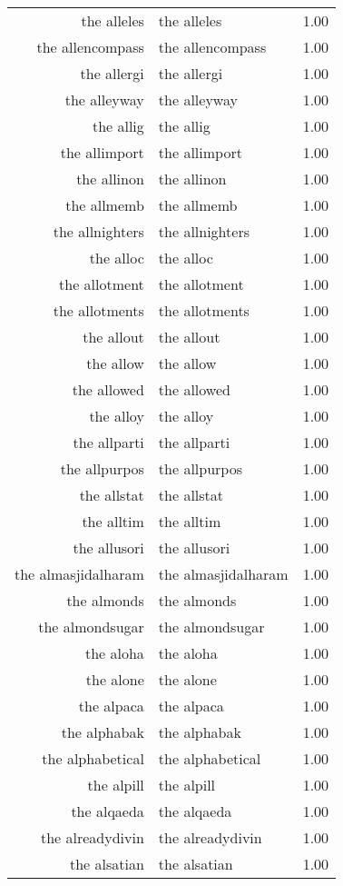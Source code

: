 \begin{table}[ht]
\begin{tabular}{rlr}
  the alleles & the alleles & 1.00 \\ 
  the allencompass & the allencompass & 1.00 \\ 
  the allergi & the allergi & 1.00 \\ 
  the alleyway & the alleyway & 1.00 \\ 
  the allig & the allig & 1.00 \\ 
  the allimport & the allimport & 1.00 \\ 
  the allinon & the allinon & 1.00 \\ 
  the allmemb & the allmemb & 1.00 \\ 
  the allnighters & the allnighters & 1.00 \\ 
  the alloc & the alloc & 1.00 \\ 
  the allotment & the allotment & 1.00 \\ 
  the allotments & the allotments & 1.00 \\ 
  the allout & the allout & 1.00 \\ 
  the allow & the allow & 1.00 \\ 
  the allowed & the allowed & 1.00 \\ 
  the alloy & the alloy & 1.00 \\ 
  the allparti & the allparti & 1.00 \\ 
  the allpurpos & the allpurpos & 1.00 \\ 
  the allstat & the allstat & 1.00 \\ 
  the alltim & the alltim & 1.00 \\ 
  the allusori & the allusori & 1.00 \\ 
  the almasjidalharam & the almasjidalharam & 1.00 \\ 
  the almonds & the almonds & 1.00 \\ 
  the almondsugar & the almondsugar & 1.00 \\ 
  the aloha & the aloha & 1.00 \\ 
  the alone & the alone & 1.00 \\ 
  the alpaca & the alpaca & 1.00 \\ 
  the alphabak & the alphabak & 1.00 \\ 
  the alphabetical & the alphabetical & 1.00 \\ 
  the alpill & the alpill & 1.00 \\ 
  the alqaeda & the alqaeda & 1.00 \\ 
  the alreadydivin & the alreadydivin & 1.00 \\ 
  the alsatian & the alsatian & 1.00 \\ 

\end{tabular}
\end{table}
